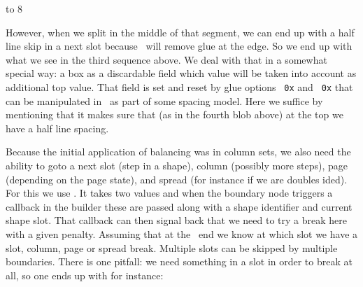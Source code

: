         \blackrule[width=\hsize,  height=\strutht,  depth=\strutdp,  color=darkgray]\par
        \blackrule[width=.2\hsize,height=.5\strutht,depth=.5\strutdp,color=darkred]\par
        \blackrule[width=\hsize,  height=\strutht,  depth=\strutdp,  color=darkgray]\par
        \blackrule[width=.6\hsize,height=\strutht,  depth=\strutdp,  color=darkgray]
        \vfill
    \egroup
    \quad
     to 8\lineheight \bgroup \forgetall \raggedcenter \offinterlineskip \hsize 3cm
        \blackrule[width=.2\hsize,height=.5\strutht,depth=.5\strutdp,color=darkred]\par
        \blackrule[width=\hsize,  height=\strutht,  depth=\strutdp,  color=darkgray]\par
        \blackrule[width=.6\hsize,height=\strutht,  depth=\strutdp,  color=middlegray]\par
        \blackrule[width=\hsize,  height=\strutht,  depth=\strutdp,  color=darkgray]\par
        \blackrule[width=.2\hsize,height=.5\strutht,depth=.5\strutdp,color=darkred]\par
        \blackrule[width=\hsize,  height=\strutht,  depth=\strutdp,  color=darkgray]\par
        \blackrule[width=.6\hsize,height=\strutht,  depth=\strutdp,  color=darkgray]
        \vfill
    \egroup
\egroup
\stoplinecorrection

However, when we split in the middle of that segment, we can end up with a half
line skip in a next slot because \TEX\ will remove glue at the edge. So we end up
with what we see in the third sequence above. We deal with that in a somewhat
special way: a box as a discardable field which value will be taken into account
as additional top value. That field is set and reset by glue options {\tt
0x\tohexadecimal {}} and {\tt
0x\tohexadecimal {}} that can
be manipulated in \LUA\ as part of some spacing model. Here we suffice by
mentioning that it makes sure that (as in the fourth blob above) at the top we
have a half line spacing.

\stopsectionlevel

\startsectionlevel[title=Forcing breaks]

Because the initial application of balancing was in column sets, we also need the
ability to goto a next slot (step in a shape), column (possibly more steps), page
(depending on the page state), and spread (for instance if we are doubles ided).
For this we use \type {\balanceboundary}. It takes two values and when the
boundary node triggers a callback in the builder these are passed along with a
shape identifier and current shape slot. That callback can then signal back that
we need to try a break here with a given penalty. Assuming that at the \LUA\ end
we know at which slot we have a slot, column, page or spread break. Multiple
slots can be skipped by multiple boundaries. There is one pitfall: we need
something in a slot in order to break at all, so one ends up with for instance:

